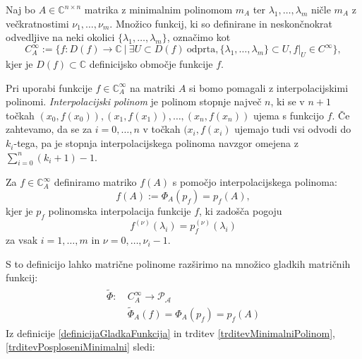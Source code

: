 \documentclass[mat1]{fmfdelo}
\newcommand{\C}{\mathbb C}
\begin{document}
Naj bo $A \in \C^{n\times n}$ matrika z minimalnim polinomom $m_A$ ter $\lambda_1, \ldots, \lambda_m$ ničle $m_A$ z večkratnostimi $\nu_1, \ldots, \nu_m$. Množico funkcij, ki so definirane in neskončnokrat odvedljive na neki okolici $\{\lambda_1, \ldots, \lambda_m\}$, označimo kot
\begin{equation*}
    C_A^\infty := \{ f: D(f) \rightarrow \C\ |\ \exists U \subset D(f)\ \text{odprta}, \{\lambda_1, \ldots, \lambda_m\} \subset U, f|_U \in C^\infty \},
\end{equation*}
kjer je $D(f) \subset \C$ definicijsko območje funkcije $f$.

Pri uporabi funkcije $f \in \C_A^\infty$ na matriki $A$ si bomo pomagali z interpolacijskimi polinomi. \emph{Interpolacijski polinom} je polinom stopnje največ $n$, ki se v $n+1$ točkah $(x_0, f(x_0)), (x_1, f(x_1)), \ldots, (x_n, f(x_n))$ ujema s funkcijo $f$. Če zahtevamo, da se za $i=0, \ldots, n$ v točkah $(x_i, f(x_i)$ ujemajo tudi vsi odvodi do $k_i$-tega, pa je stopnja interpolacijskega polinoma navzgor omejena z $\sum_{i=0}^n (k_i + 1) - 1$.
\begin{definicija} \label{definicijaGladkaFunkcija}
    Za $f \in \C_A^\infty$ definiramo matriko $f(A)$ s pomočjo interpolacijskega polinoma:
    \begin{equation*}
        f(A) := \Phi_A(p_f) = p_f(A),
    \end{equation*}
    kjer je $p_f$ polinomska interpolacija funkcije $f$, ki zadošča pogoju
    \begin{equation*}
        f^{(\nu)}(\lambda_i) = p_f^{(\nu)}(\lambda_i)
    \end{equation*}
    za vsak $i = 1, \ldots, m$ in $\nu = 0, \ldots, \nu_i-1$.
\end{definicija}
S to definicijo lahko matrične polinome razširimo na množico gladkih matričnih funkcij:
\begin{align}
    \begin{split}
        \widetilde{\Phi} :\ &C_A^\infty \longrightarrow \mathcal{P_A} \\
        &\widetilde{\Phi}_A(f) = \Phi_A(p_f) = p_f(A)
    \end{split}
\end{align}
Iz definicije \ref{definicijaGladkaFunkcija} in trditev \ref{trditevMinimalniPolinom}, \ref{trditevPosploseniMinimalni} sledi:
\end{document}
